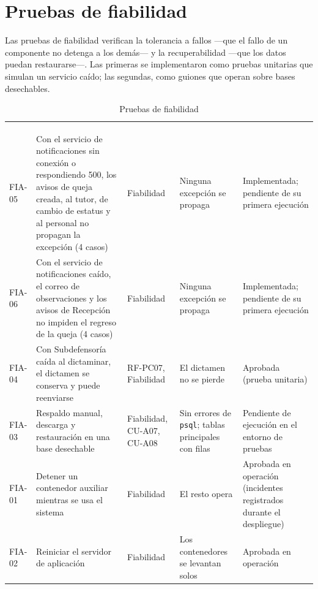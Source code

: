 	\section{Pruebas de fiabilidad}
	\label{sec:pruebas_fiabilidad}
	Las pruebas de fiabilidad verifican la tolerancia a fallos ---que el fallo de un componente no
	detenga a los demás--- y la recuperabilidad ---que los datos puedan restaurarse---. Las primeras se
	implementaron como pruebas unitarias que simulan un servicio caído; las segundas, como guiones que
	operan sobre bases desechables.

	\small
	\renewcommand{\arraystretch}{1.2}
	\setlength{\tabcolsep}{4pt}
	\begin{longtable}{|p{1.2cm}|L{5.6cm}|L{2.2cm}|L{2.6cm}|L{2.9cm}|}
		\hiderowcolors\caption{Pruebas de fiabilidad}
		\label{tab:pruebas_fiabilidad} \\ \showrowcolors
		\hline
		 &  &  &
		 &  \\
		\hline
		\endfirsthead
		\hline
		 &  &  &
		 &  \\
		\hline
		\endhead
		FIA-05 & Con el servicio de notificaciones sin conexión o respondiendo 500, los avisos de queja
		creada, al tutor, de cambio de estatus y al personal no propagan la excepción (4 casos) & Fiabilidad &
		Ninguna excepción se propaga & Implementada; pendiente de su primera ejecución \\ \hline
		FIA-06 & Con el servicio de notificaciones caído, el correo de observaciones y los avisos de
		Recepción no impiden el regreso de la queja (4 casos) & Fiabilidad & Ninguna excepción se propaga &
		Implementada; pendiente de su primera ejecución \\ \hline
		FIA-04 & Con Subdefensoría caída al dictaminar, el dictamen se conserva y puede reenviarse & RF-PC07, Fiabilidad & El dictamen no se pierde & Aprobada (prueba unitaria) \\ \hline
		FIA-03 & Respaldo manual, descarga y restauración en una base desechable & Fiabilidad, CU-A07, CU-A08 & Sin
		errores de \texttt{psql}; tablas principales con filas & Pendiente de ejecución en el entorno de
		pruebas \\ \hline
		FIA-01 & Detener un contenedor auxiliar mientras se usa el sistema & Fiabilidad & El resto opera &
		Aprobada en operación (incidentes registrados durante el despliegue) \\ \hline
		FIA-02 & Reiniciar el servidor de aplicación & Fiabilidad & Los contenedores se levantan solos &
		Aprobada en operación \\ \hline
	\end{longtable}
	\normalsize

